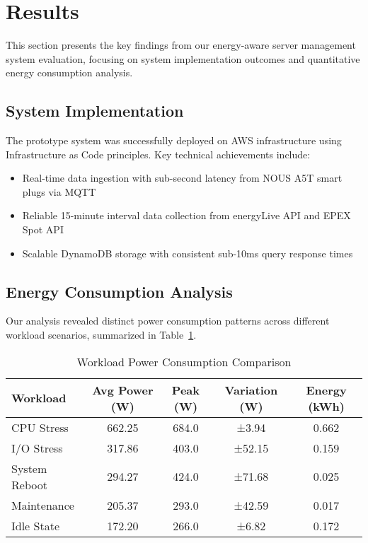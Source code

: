

\section{Results}
\label{results:results}
This section presents the key findings from our energy-aware server management system evaluation, focusing on system implementation outcomes and quantitative energy consumption analysis.

\subsection{System Implementation}
\label{results:system-implementation}
The prototype system was successfully deployed on AWS infrastructure using Infrastructure as Code principles. Key technical achievements include:
\begin{itemize}
    \item Real-time data ingestion with sub-second latency from NOUS A5T smart plugs via MQTT
    \item Reliable 15-minute interval data collection from energyLive API and EPEX Spot API
    \item Scalable DynamoDB storage with consistent sub-10ms query response times
\end{itemize}

\subsection{Energy Consumption Analysis}
\label{results:energy-analysis}
Our analysis revealed distinct power consumption patterns across different workload scenarios, summarized in Table~\ref{tab:workload-comparison}.

\begin{table}[h]
\caption{Workload Power Consumption Comparison}
\label{tab:workload-comparison}
\begin{tabular}{lcccc}
\hline
\textbf{Workload} & \textbf{Avg Power (W)} & \textbf{Peak (W)} & \textbf{Variation (W)} & \textbf{Energy (kWh)} \\
\hline
CPU Stress & 662.25 & 684.0 & ±3.94 & 0.662 \\
I/O Stress & 317.86 & 403.0 & ±52.15 & 0.159 \\
System Reboot & 294.27 & 424.0 & ±71.68 & 0.025 \\
Maintenance & 205.37 & 293.0 & ±42.59 & 0.017 \\
Idle State & 172.20 & 266.0 & ±6.82 & 0.172 \\
\hline
\end{tabular}
\end{table}

